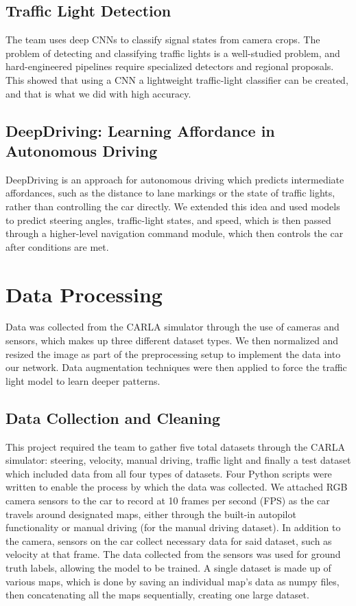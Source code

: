 \documentclass{article} %
\begin{document}
\subsection{Traffic Light Detection \citep{3.4Ref}}
The team uses deep CNNs to classify signal states from camera crops. The problem of detecting and classifying traffic lights is a
well-studied problem, and hard-engineered pipelines require specialized detectors and regional proposals. This showed that using a
CNN a lightweight traffic-light classifier can be created, and that is what we did with high accuracy.

\subsection{DeepDriving: Learning Affordance in Autonomous Driving \citep{3.5Ref}}
DeepDriving is an approach for autonomous driving which predicts intermediate affordances, such as the distance to
lane markings or the state of traffic lights, rather than controlling the car directly. We extended this idea and used
models to predict steering angles, traffic-light states, and speed, which is then passed through a higher-level navigation
command module, which then controls the car after conditions are met.


\section{Data Processing}

Data was collected from the CARLA simulator through the use of cameras and sensors, which makes up three different dataset types. We then normalized and resized the image as part of the preprocessing setup to implement the data into our network. Data augmentation techniques were then applied to force the traffic light model to learn deeper patterns.

\subsection{Data Collection and Cleaning}
This project required the team to gather five total datasets through the CARLA simulator: steering, velocity, manual driving, traffic light and finally a test dataset which included data from all four types of datasets. Four Python scripts were written to enable the process by which the data was collected. We attached RGB camera sensors to the car to record at 10 frames per second (FPS) as the car travels around designated maps, either through the built-in autopilot functionality or manual driving (for the manual driving dataset). In addition to the camera, sensors on the car collect necessary data for said dataset, such as velocity at that frame. The data collected from the sensors was used for ground truth labels, allowing the model to be trained. A single dataset is made up of various maps, which is done by saving an individual map’s data as numpy files, then concatenating all the maps sequentially, creating one large dataset.
\end{document}
